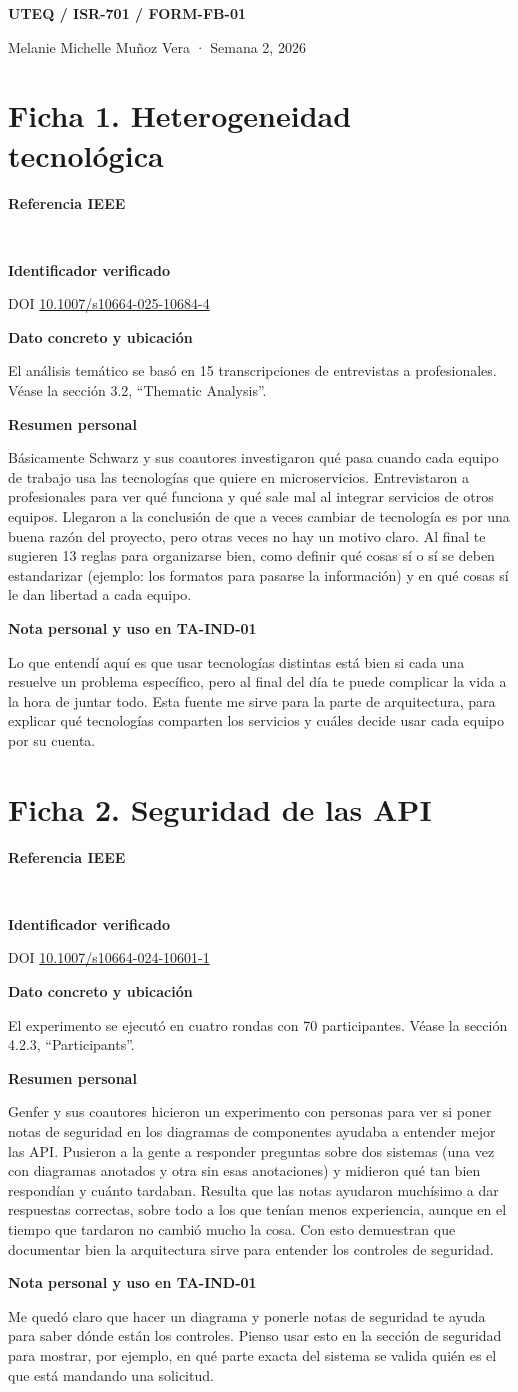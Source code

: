 \documentclass[11pt,a4paper]{article}
\newcommand{\ficha}[6]{%
  \section*{\color{tinta}#1}
  \textbf{Referencia IEEE}\par
  \cite{#2}\ \fullcite{#2}\par
  \textbf{Identificador verificado}\par
  #3\par
  \textbf{Dato concreto y ubicación}\par
  #4\par
  \textbf{Resumen personal}\par\nopagebreak[4]
  #5\par
  \textbf{Nota personal y uso en TA-IND-01}\par\nopagebreak[4]
  #6\par
}
\begin{document}
{\color{tinta}\textbf{UTEQ / ISR-701 / FORM-FB-01}}\par
Melanie Michelle Muñoz Vera · Semana 2, 2026\par

\ficha{Ficha 1. Heterogeneidad tecnológica}{schwarz2025}
  {DOI \href{https://doi.org/10.1007/s10664-025-10684-4}{10.1007/s10664-025-10684-4}}
  {El análisis temático se basó en 15 transcripciones de entrevistas a profesionales. Véase la sección 3.2, ``Thematic Analysis''.}
  {Básicamente Schwarz y sus coautores investigaron qué pasa cuando cada equipo de trabajo usa las tecnologías que quiere en microservicios. Entrevistaron a profesionales para ver qué funciona y qué sale mal al integrar servicios de otros equipos. Llegaron a la conclusión de que a veces cambiar de tecnología es por una buena razón del proyecto, pero otras veces no hay un motivo claro. Al final te sugieren 13 reglas para organizarse bien, como definir qué cosas sí o sí se deben estandarizar (ejemplo: los formatos para pasarse la información) y en qué cosas sí le dan libertad a cada equipo.}
  {Lo que entendí aquí es que usar tecnologías distintas está bien si cada una resuelve un problema específico, pero al final del día te puede complicar la vida a la hora de juntar todo. Esta fuente me sirve para la parte de arquitectura, para explicar qué tecnologías comparten los servicios y cuáles decide usar cada equipo por su cuenta.}

\ficha{Ficha 2. Seguridad de las API}{genfer2025}
  {DOI \href{https://doi.org/10.1007/s10664-024-10601-1}{10.1007/s10664-024-10601-1}}
  {El experimento se ejecutó en cuatro rondas con 70 participantes. Véase la sección 4.2.3, ``Participants''.}
  {Genfer y sus coautores hicieron un experimento con personas para ver si poner notas de seguridad en los diagramas de componentes ayudaba a entender mejor las API. Pusieron a la gente a responder preguntas sobre dos sistemas (una vez con diagramas anotados y otra sin esas anotaciones) y midieron qué tan bien respondían y cuánto tardaban. Resulta que las notas ayudaron muchísimo a dar respuestas correctas, sobre todo a los que tenían menos experiencia, aunque en el tiempo que tardaron no cambió mucho la cosa. Con esto demuestran que documentar bien la arquitectura sirve para entender los controles de seguridad.}
  {Me quedó claro que hacer un diagrama y ponerle notas de seguridad te ayuda para saber dónde están los controles. Pienso usar esto en la sección de seguridad para mostrar, por ejemplo, en qué parte exacta del sistema se valida quién es el que está mandando una solicitud.}
\end{document}
